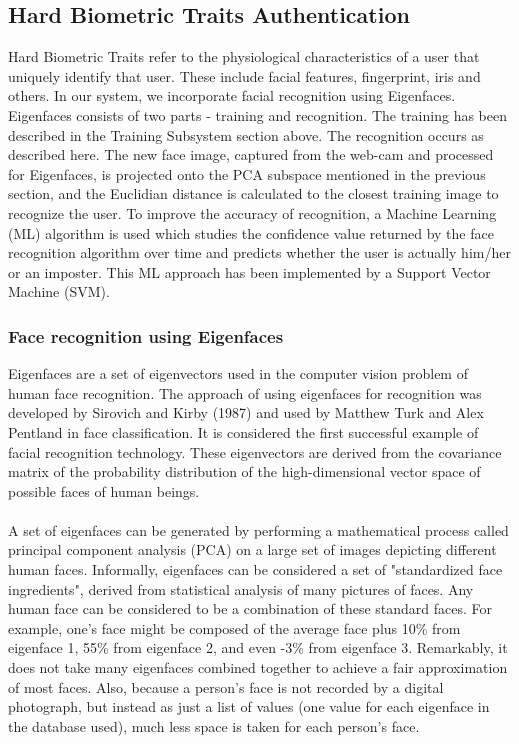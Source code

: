\documentclass[12pt]{article}			%
\begin{document}
\subsection{Hard Biometric Traits Authentication}
Hard Biometric Traits refer to the physiological characteristics of a user that uniquely identify that user. These include facial features, fingerprint, iris and others. In our system, we incorporate facial recognition using Eigenfaces. Eigenfaces consists of two parts - training and recognition. The training has been described in the Training Subsystem section above. The recognition occurs as described here. The new face image, captured from the web-cam and processed for Eigenfaces, is projected onto the PCA subspace mentioned in the previous section, and the Euclidian distance is calculated to the closest training image to recognize the user. To improve the accuracy of recognition, a Machine Learning (ML) algorithm is used which studies the confidence value returned by the face recognition algorithm over time and predicts whether the user is actually him/her or an imposter. This ML approach has been implemented by a Support Vector Machine (SVM).

\subsubsection{Face recognition using Eigenfaces}
Eigenfaces are a set of eigenvectors used in the computer vision problem of human face recognition. The approach of using eigenfaces for recognition was developed by Sirovich and Kirby (1987) and used by Matthew Turk and Alex Pentland in face classification. It is considered the first successful example of facial recognition technology. These eigenvectors are derived from the covariance matrix of the probability distribution of the high-dimensional vector space of possible faces of human beings.\\

\\
A set of eigenfaces can be generated by performing a mathematical process called principal component analysis (PCA) on a large set of images depicting different human faces. Informally, eigenfaces can be considered a set of "standardized face ingredients", derived from statistical analysis of many pictures of faces. Any human face can be considered to be a combination of these standard faces. For example, one's face might be composed of the average face plus 10\% from eigenface 1, 55\% from eigenface 2, and even -3\% from eigenface 3. Remarkably, it does not take many eigenfaces combined together to achieve a fair approximation of most faces. Also, because a person's face is not recorded by a digital photograph, but instead as just a list of values (one value for each eigenface in the database used), much less space is taken for each person's face.
\end{document}
